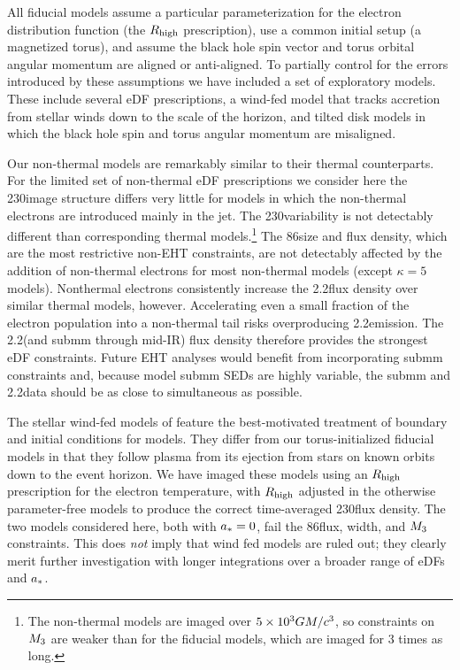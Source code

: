 All fiducial models assume a particular parameterization for the electron distribution function (the $R_\mathrm{high}$ prescription), use a common initial setup (a magnetized torus), and assume the black hole spin vector and torus orbital angular momentum are aligned or anti-aligned.
To partially control for the errors introduced by these assumptions we have included a set of exploratory models.  These include several eDF prescriptions, a wind-fed model that tracks accretion from stellar winds down to the scale of the horizon, and tilted disk models in which the black hole spin and torus angular momentum are misaligned.

Our non-thermal models are remarkably similar to their thermal counterparts.
For the limited set of non-thermal eDF prescriptions we consider here the 230\GHz image structure differs very little for models in which the non-thermal electrons are introduced mainly in the jet.  The 230\GHz variability is not detectably different than corresponding thermal models.\footnote{The non-thermal models are imaged over $5\times 10^3GM/c^3$, so constraints on $M_{3}$ are weaker than for the fiducial models, which are imaged for 3 times as long.}
The 86\GHz size and flux density, which are the most restrictive non-EHT constraints, are not detectably affected by the addition of non-thermal electrons for most non-thermal models (except $\kappa = 5$ models).
Nonthermal electrons consistently increase the 2.2\um flux density over similar thermal models, however.
Accelerating even a small fraction of the electron population into a non-thermal tail risks overproducing 2.2\um emission.
The 2.2\um (and submm through mid-IR) flux density therefore provides the strongest eDF constraints.
Future EHT analyses would benefit from incorporating submm constraints \citep[e.g.,][]{2019ApJ...881L...2B} and, because model submm SEDs are highly variable, the submm and 2.2\um data should be as close to simultaneous as possible.

The stellar wind-fed models of \citet{2020ApJ...896L...6R} feature the best-motivated treatment of boundary and initial conditions for \sgra models.
They differ from our torus-initialized fiducial models in that they follow plasma from its ejection from stars on known orbits down to the event horizon.
We have imaged these models using an $R_\mathrm{high}$ prescription for the electron temperature, with $R_\mathrm{high}$ adjusted in the otherwise parameter-free models to produce the correct time-averaged 230\GHz flux density.
The two models considered here, both with $a_* = 0$, fail the 86\GHz flux, \mring width, and $M_{3}$ constraints.
This does {\em not} imply that wind fed models are ruled out; they clearly merit further investigation with longer integrations over a broader range of eDFs and $a_*$.

